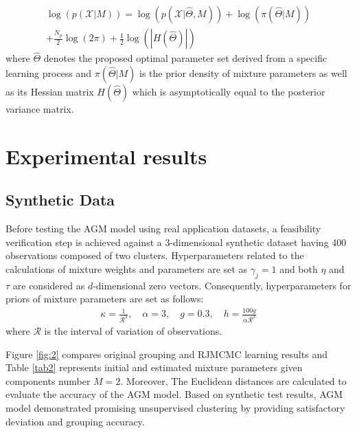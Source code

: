 \documentclass[conference]{IEEEtran}
\begin{document}
\begin{multline}
\log(p(\mathcal{X}|M)) = \log(p(\mathcal{X}|\hat{\Theta},M)) + \log(\pi(\hat{\Theta}|M)) \\
 + \frac{N_p}{2}\log(2\pi)+\frac{1}{2}\log(|H(\hat{\Theta})|)\qquad\quad
\label{eq:margLikeli}
\end{multline}
where $\hat{\Theta}$ denotes the proposed optimal parameter set derived from a specific learning process and $\pi(\hat{\Theta}|M)$ is the prior density of mixture parameters as well as its Hessian matrix $H(\hat{\Theta})$ which is asymptotically equal to the posterior variance matrix.

\section{Experimental results}
\subsection{Synthetic Data}
Before testing the AGM model using real application datasets, a feasibility verification step is achieved against a 3-dimensional synthetic dataset having 400 observations composed of two clusters. Hyperparameters related to the calculations of mixture weights and parameters are set as $\gamma_j = 1$ and both $\eta$ and $\tau$ are considered as $d$-dimensional zero vectors. Consequently, hyperparameters for priors of mixture parameters are set as follows\cite{Stephens2000}:
\begin{align}
\kappa = \frac{1}{\mathcal{R}^2}, \quad \alpha = 3, \quad g=0.3, \quad h=\frac{100g}{\alpha\mathcal{R}^2}
\label{eq:hypers}
\end{align}
where $\mathcal{R}$ is the interval of variation of observations.

Figure \ref{fig:2} compares original grouping and RJMCMC learning results and Table \ref{tab2} represents initial and estimated mixture parameters given components number $M=2$. Moreover, The Euclidean distances are calculated to evaluate the accuracy of the AGM model. Based on synthetic test results, AGM model demonstrated promising unsupervised clustering by providing satisfactory deviation and grouping accuracy.
\end{document}
